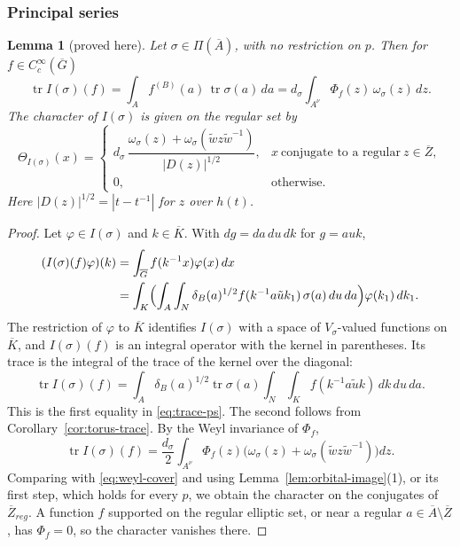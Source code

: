 \documentclass[12pt,letterpaper]{article}
\numberwithin{equation}{section}
\newtheorem{lemma}[theorem]{Lemma}
\theoremstyle{definition}
\newcommand{\proved}{proved here}
\newcommand{\bG}{\overline{G}}
\newcommand{\bA}{\overline{A}}
\newcommand{\bZ}{\overline{Z}}
\newcommand{\bK}{\overline{K}}
\newcommand{\wt}{\tilde w}
\DeclareMathOperator{\tr}{tr}
\begin{document}
\subsubsection{Principal series}

\begin{lemma}[\proved]\label{lem:ps-character}
Let $\sigma\in\Pi(\bA)$, with no restriction on $p$.  Then for $f\in C_c^\infty(\bG)$
\begin{equation}\label{eq:trace-ps}
\tr I(\sigma)(f)=\int_A f^{(B)}(a)\,\tr\sigma(a)\,da=d_\sigma\int_{A^\nu}\Phi_f(z)\,\omega_\sigma(z)\,dz .
\end{equation}
The character of $I(\sigma)$ is given on the regular set by
\[
\Theta_{I(\sigma)}(x)=\begin{cases}
d_\sigma\,\dfrac{\omega_\sigma(z)+\omega_\sigma(\wt z\wt^{-1})}{|D(z)|^{1/2}},& x\ \text{conjugate to a regular}\ z\in\bZ,\\[8pt]
0,& \text{otherwise}.
\end{cases}
\]
Here $|D(z)|^{1/2}=|t-t^{-1}|$ for $z$ over $h(t)$.
\end{lemma}
\begin{proof}
Let $\varphi\in I(\sigma)$ and $k\in\bK$.  With $dg=da\,du\,dk$ for $g=auk$,
\begin{align*}
(I(\sigma)(f)\varphi)(k)&=\int_{\bG}f(k^{-1}x)\varphi(x)\,dx\\
&=\int_K\Bigl(\int_A\int_N\delta_B(a)^{1/2}f(k^{-1}a\tilde uk_1)\,\sigma(a)\,du\,da\Bigr)\varphi(k_1)\,dk_1 .
\end{align*}
The restriction of $\varphi$ to $\bK$ identifies $I(\sigma)$ with a space of
$V_\sigma$-valued functions on $\bK$, and $I(\sigma)(f)$ is an integral operator with the
kernel in parentheses.  Its trace is the integral of the trace of the kernel over the
diagonal:
\begin{equation}\label{eq:trace-kernel}
\tr I(\sigma)(f)=\int_A\delta_B(a)^{1/2}\tr\sigma(a)\int_N\int_Kf(k^{-1}a\tilde uk)\,dk\,du\,da .
\end{equation}
This is the first equality in \eqref{eq:trace-ps}.  The second follows from
Corollary~\ref{cor:torus-trace}.  By the Weyl invariance of $\Phi_f$,
\[
\tr I(\sigma)(f)=\frac{d_\sigma}2\int_{A^\nu}\Phi_f(z)\bigl(\omega_\sigma(z)+\omega_\sigma(\wt z\wt^{-1})\bigr)dz .
\]
Comparing with \eqref{eq:weyl-cover} and using Lemma~\ref{lem:orbital-image}(1), or its
first step, which holds for every $p$, we obtain the character on the conjugates of
$\bZ_{reg}$.  A function $f$ supported on the regular elliptic set, or near a regular
$a\in\bA\setminus\bZ$, has $\Phi_f=0$, so the character vanishes there.
\end{proof}
\end{document}
